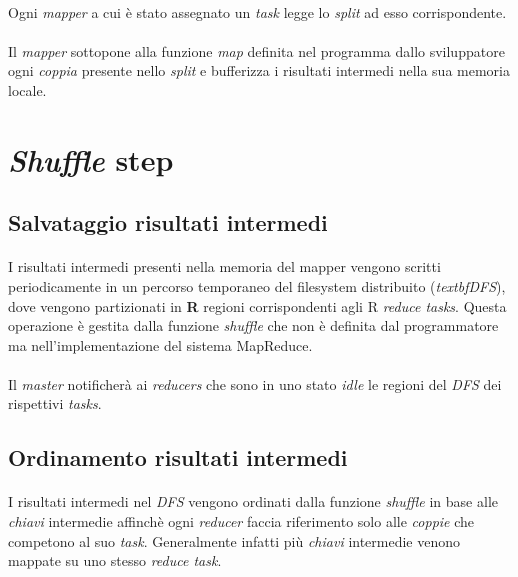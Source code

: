 \documentclass[a4paper,11pt]{report}
\begin{document}
\paragraph{}
Ogni \emph {mapper} a cui è stato assegnato un \emph {task} legge lo \emph {split} ad esso corrispondente.
\paragraph{}
Il \emph{mapper} sottopone alla funzione \emph{map} definita nel programma dallo sviluppatore ogni \emph {coppia} presente nello
\emph{split} e 
bufferizza i risultati intermedi nella sua memoria locale.

\section{\emph{Shuffle} step}
\subsection{Salvataggio risultati intermedi}
\paragraph{}
I risultati intermedi presenti nella memoria del mapper vengono scritti periodicamente in un percorso temporaneo del filesystem distribuito
(\emph{textbf{DFS}}), dove vengono
partizionati in \textbf R regioni corrispondenti agli R \emph{reduce tasks}. Questa operazione è gestita dalla funzione \emph{shuffle} che
non è definita dal programmatore 
ma nell'implementazione del sistema MapReduce. 
\paragraph{}
Il \emph{master} notificherà ai \emph{reducers} che sono in uno stato \emph{idle} le regioni del \emph{DFS} dei rispettivi \emph{tasks}.
\subsection{Ordinamento risultati intermedi}
\paragraph{}
I risultati intermedi nel \emph{DFS} vengono ordinati dalla funzione \emph{shuffle} in base alle \emph{chiavi} intermedie affinchè ogni
\emph{reducer} faccia riferimento
solo alle \emph{coppie} che competono al suo \emph{task}. Generalmente infatti più \emph{chiavi} intermedie venono mappate su uno stesso
\emph{reduce task}.
\end{document}
